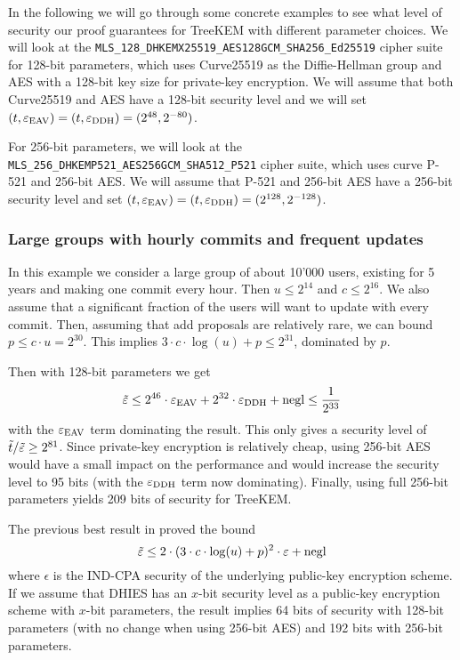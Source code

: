 In the following we will go through some concrete examples to see what level of security our proof guarantees for TreeKEM with different parameter choices. We will look at the \texttt{MLS\_128\_DHKEMX25519\_AES128GCM\_SHA256\_Ed25519} cipher suite \cite[Section~17.1]{rfc9420} for 128-bit parameters, which uses Curve25519 as the Diffie-Hellman group and AES with a 128-bit key size for private-key encryption. We will assume that both Curve25519 and AES have a 128-bit security level and we will set $(t, \varepsilon_\mathrm{EAV}) = (t, \varepsilon_\mathrm{DDH}) = (2^{48}, 2^{-80})$.

For 256-bit parameters, we will look at the \texttt{MLS\_256\_DHKEMP521\_AES256GCM\_SHA512\_P521} cipher suite, which uses curve P-521 and 256-bit AES. We will assume that P-521 and 256-bit AES have a 256-bit security level and set $(t, \varepsilon_\mathrm{EAV}) = (t, \varepsilon_\mathrm{DDH}) = (2^{128}, 2^{-128})$.

\subsubsection{Large groups with hourly commits and frequent updates}

In this example we consider a large group of about 10'000 users, existing for 5 years and making one commit every hour. Then $u \le 2^{14}$ and $c \le 2^{16}$. We also assume that a significant fraction of the users will want to update with every commit. Then, assuming that add proposals are relatively rare, we can bound $p \le c \cdot u = 2^{30}$. This implies $3 \cdot c \cdot \log(u) + p \le 2^{31}$, dominated by $p$.

Then with 128-bit parameters we get
\[
	\tilde{\varepsilon} \le 2^{46} \cdot \varepsilon_\mathrm{EAV} + 2^{32} \cdot \varepsilon_\mathrm{DDH} + \mathrm{negl} \le \frac{1}{2^{33}}
\]
with the $\varepsilon_\mathrm{EAV}$ term dominating the result. This only gives a security level of $\tilde{t}/\tilde{\varepsilon} \ge 2^{81}$. Since private-key encryption is relatively cheap, using 256-bit AES would have a small impact on the performance and would increase the security level to 95 bits (with the $\varepsilon_\mathrm{DDH}$ term now dominating). Finally, using full 256-bit parameters yields 209 bits of security for TreeKEM.

The previous best result in \cite[Theorem 3]{ttkem} proved the bound
\[
	\tilde{\varepsilon} \le 2 \cdot (3 \cdot c \cdot \log(u) + p)^2 \cdot \varepsilon + \mathrm{negl}
\]
where $\epsilon$ is the IND-CPA security of the underlying public-key encryption scheme. If we assume that DHIES has an $x$-bit security level as a public-key encryption scheme with $x$-bit parameters, the result implies 64 bits of security with 128-bit parameters (with no change when using 256-bit AES) and 192 bits with 256-bit parameters.

